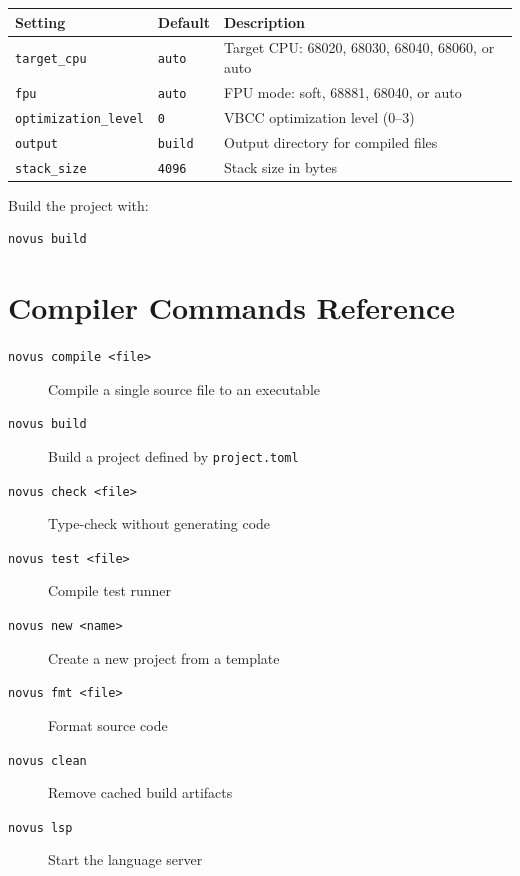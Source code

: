 \begin{center}
\begin{tabular}{llp{6cm}}
\textbf{Setting} & \textbf{Default} & \textbf{Description} \\
\hline
\texttt{target\_cpu} & \texttt{auto} & Target CPU: 68020, 68030, 68040, 68060, or auto \\
\texttt{fpu} & \texttt{auto} & FPU mode: soft, 68881, 68040, or auto \\
\texttt{optimization\_level} & \texttt{0} & VBCC optimization level (0--3) \\
\texttt{output} & \texttt{build} & Output directory for compiled files \\
\texttt{stack\_size} & \texttt{4096} & Stack size in bytes \\
\end{tabular}
\end{center}

Build the project with:

\begin{lstlisting}[language=bash]
novus build
\end{lstlisting}

\section{Compiler Commands Reference}
\label{sec:commands}

\begin{description}
    \item[\texttt{novus compile <file>}] Compile a single source file to an executable
    \item[\texttt{novus build}] Build a project defined by \texttt{project.toml}
    \item[\texttt{novus check <file>}] Type-check without generating code
    \item[\texttt{novus test <file>}] Compile test runner
    \item[\texttt{novus new <name>}] Create a new project from a template
    \item[\texttt{novus fmt <file>}] Format source code
    \item[\texttt{novus clean}] Remove cached build artifacts
    \item[\texttt{novus lsp}] Start the language server
\end{description}

